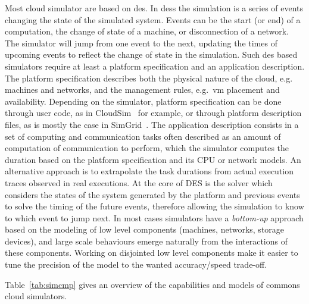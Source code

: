 \documentclass[10pt,conference,compsocconf]{IEEEtran}
\begin{document}
Most cloud  simulator are based on  \ac{des}. In \aclp{des} the  simulation is a
series of events changing the state of  the simulated system.  Events can be the
start  (or  end)  of a  computation,  the  change  of  state of  a  machine,  or
disconnection of a network.  The simulator will jump from one event to the next,
updating the  times of  upcoming events to  reflect the change  of state  in the
simulation.   Such  \ac{des}  based  simulators  require  at  least  a  platform
specification  and  an  application  description.   The  platform  specification
describes both the physical nature of the cloud, e.g. machines and networks, and
the management rules, e.g.~\ac{vm} placement and availability.  Depending on the
simulator,  platform  specification  can  be  done  through  user  code,  as  in
CloudSim~\cite{cloudsim} for example, or  through platform description files, as
is  mostly  the case  in  SimGrid~\cite{simgrid}.   The application  description
consists in  a set of  computing and communication  tasks often described  as an
amount of computation of communication  to perform, which the simulator computes
the duration based on the platform  specification and its CPU or network models.
An  alternative  approach is  to  extrapolate  the  task durations  from  actual
execution traces observed in real executions.
%
At  the core  of DES  is the  solver which  considers the  states of  the system
generated by the platform and previous events  to solve the timing of the future
events,  therefore allowing  the  simulation  to know  to  which  event to  jump
next. In  most cases simulators  have a  \emph{bottom-up} approach based  on the
modeling  of low  level components  (machines, networks,  storage devices),  and
large  scale  behaviours  emerge naturally  from  the  interactions  of  these
components. Working  on disjointed low level  components make it easier  to tune
the precision  of the model to  the wanted accuracy/speed trade-off.

Table~\ref{tab:simcmp} gives an overview of the capabilities and models of
commons cloud simulators. 
\end{document}
